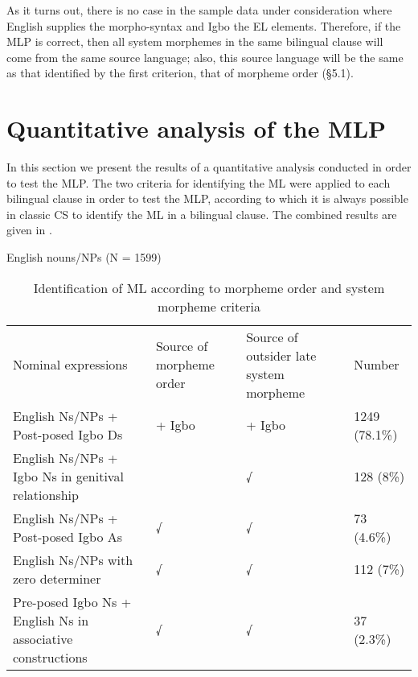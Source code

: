 \documentclass[output=paper]{langsci/langscibook}
\begin{document}
As it turns out, there is no case in the sample data under consideration where English supplies the morpho-syntax and Igbo the EL elements. Therefore, if the MLP is correct, then all system morphemes in the same bilingual clause will come from the same source language; also, this source language will be the same as that identified by the first criterion, that of morpheme order (§5.1).

\section{Quantitative analysis of the MLP}

In this section we present the results of a quantitative analysis conducted in order to test the MLP. The two criteria for identifying the ML were applied to each bilingual clause in order to test the MLP, according to which it is always possible in classic CS to identify the ML in a bilingual clause. The combined results are given in . 

\begin{stylelsTableHeading}%
\begin{table}
English nouns/NPs (N = 1599)

\begin{tabularx}{\textwidth}{XXXX}
Nominal expressions                                             & Source of morpheme order & Source of outsider late system morpheme & Number \\
English Ns/NPs + Post-posed Igbo Ds                             & + Igbo   &   + Igbo & 1249 (78.1\%) \\
English Ns/NPs + Igbo Ns in genitival relationship             &          &    √       & 128 (8\%)     \\
English Ns/NPs + Post-posed Igbo As                            &  √      &     √      &  73 (4.6\%)   \\
English Ns/NPs with zero determiner                            &  √     &      √      &  112 (7\%)   \\
Pre-posed Igbo Ns + English Ns in associative constructions   &   √    &       √      & 37 (2.3\%)   \\
\end{tabularx}
     
\caption{Identification of ML according to morpheme order and system morpheme criteria}
\label{tab:2}
\end{table}\end{stylelsTableHeading}
\end{document}
